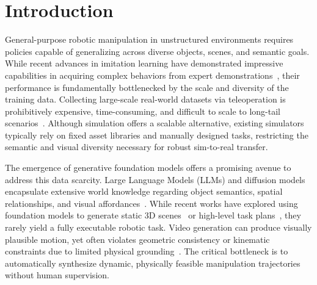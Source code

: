 \section{Introduction}

General-purpose robotic manipulation in unstructured environments requires policies capable of generalizing across diverse objects, scenes, and semantic goals. While recent advances in imitation learning have demonstrated impressive capabilities in acquiring complex behaviors from expert demonstrations~\cite{chi2023diffusion, zhao2023learning}, their performance is fundamentally bottlenecked by the scale and diversity of the training data. Collecting large-scale real-world datasets via teleoperation is prohibitively expensive, time-consuming, and difficult to scale to long-tail scenarios~\cite{brohan2022rt, padalkar2023open}. Although simulation offers a scalable alternative, existing simulators typically rely on fixed asset libraries and manually designed tasks, restricting the semantic and visual diversity necessary for robust sim-to-real transfer.



The emergence of generative foundation models offers a promising avenue to address this data scarcity. Large Language Models (LLMs) and diffusion models encapsulate extensive world knowledge regarding object semantics, spatial relationships, and visual affordances~\cite{yang2023foundation, wang2023voyager}. 
While recent works have explored using foundation models to generate static 3D scenes~\cite{deitke2023procthor} or high-level task plans~\cite{ahn2022can}, they rarely yield a fully executable robotic task. Video generation can produce visually plausible motion, yet often violates geometric consistency or kinematic constraints due to limited physical grounding~\cite{wu2023tune}. The critical bottleneck is to automatically synthesize dynamic, physically feasible manipulation trajectories without human supervision.

